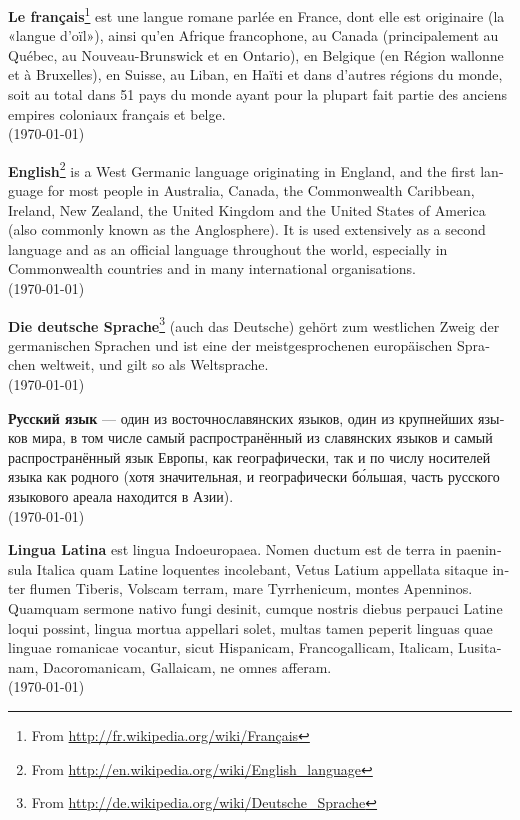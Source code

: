 \documentclass[a4paper]{article}
\begin{document}
\noindent
\textbf{Le français}\footnote{ From \url{http://fr.wikipedia.org/wiki/Français}} est une langue romane parlée en France, dont elle est originaire (la «langue d'oïl»), ainsi qu'en Afrique francophone, au Canada (principalement au Québec, au Nouveau-Brunswick et en Ontario), en Belgique (en Région wallonne et à Bruxelles), en Suisse, au Liban, en Haïti et dans d'autres régions du monde, soit au total dans 51 pays du monde ayant pour la plupart fait partie des anciens empires coloniaux français et belge. \\
(\today)

\begin{english}
\textbf{English}\footnote{From \url{http://en.wikipedia.org/wiki/English_language}} is a West Germanic language originating in England, and the first language for most people in Australia, Canada, the Commonwealth Caribbean, Ireland, New Zealand, the United Kingdom and the United States of America (also commonly known as the Anglosphere). It is used extensively as a second language and as an official language throughout the world, especially in Commonwealth countries and in many international organisations. \\
(\today)
\end{english}

\begin{german}
\textbf{Die deutsche Sprache}\footnote{ From \url{http://de.wikipedia.org/wiki/Deutsche_Sprache}} (auch das Deutsche) gehört zum westlichen Zweig der germanischen Sprachen und ist eine der meistgesprochenen europäischen Sprachen weltweit, und gilt so als Weltsprache.\\
(\today)
\end{german}

\begin{russian}
\textbf{Русский язык} — один из восточнославянских языков, один из крупнейших языков мира, в том числе самый распространённый из славянских языков и самый распространённый язык Европы, как географически, так и по числу носителей языка как родного (хотя значительная, и географически бо́льшая, часть русского языкового ареала находится в Азии).	\\
(\today)
\end{russian}

\begin{latin}
\textbf{Lingua Latina} est lingua Indoeuropaea. Nomen ductum est de terra in paeninsula Italica quam Latine loquentes incolebant, Vetus Latium appellata sitaque inter flumen Tiberis, Volscam terram, mare Tyrrhenicum, montes Apenninos. 
Quamquam sermone nativo fungi desinit, cumque nostris diebus perpauci Latine loqui possint, lingua mortua appellari solet, multas tamen peperit linguas quae linguae romanicae vocantur, sicut Hispanicam, Francogallicam, Italicam, Lusitanam, Dacoromanicam, Gallaicam, ne omnes afferam. \\
(\today) 
\end{latin}
\end{document}
